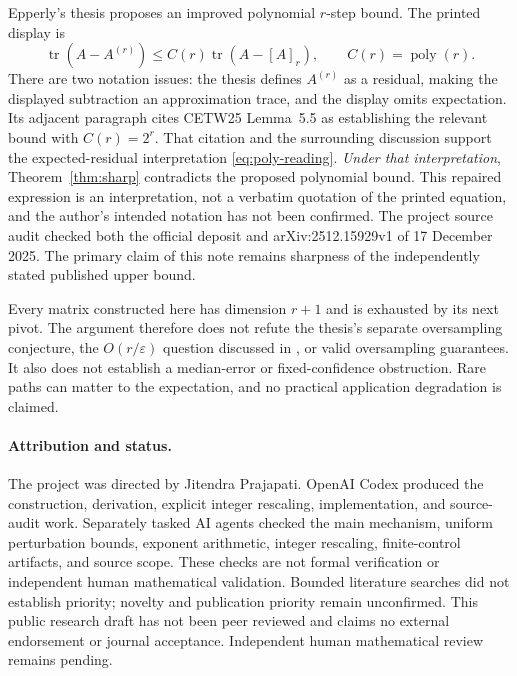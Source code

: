 \documentclass[10pt,letterpaper]{article}
\DeclareMathOperator{\tr}{tr}
\begin{document}
Epperly's thesis \cite[Conjecture~11.2, printed p.~182]{Thesis} proposes
an improved polynomial $r$-step bound. The printed display is
\[
 \tr(A-A^{(r)})\leq C(r)\tr(A-[A]_r),\qquad C(r)=\operatorname{poly}(r).
\]
There are two notation issues: the thesis defines $A^{(r)}$ as a residual,
making the displayed subtraction an approximation trace, and the display
omits expectation. Its adjacent paragraph cites CETW25 Lemma~5.5 as
establishing the relevant bound with $C(r)=2^r$. That citation and the
surrounding discussion support the expected-residual interpretation
\eqref{eq:poly-reading}. \emph{Under that interpretation},
Theorem~\ref{thm:sharp} contradicts the proposed polynomial bound.
This repaired expression is an interpretation, not a verbatim quotation
of the printed equation, and the author's intended notation has not been
confirmed. The project source audit checked both the official deposit
and arXiv:2512.15929v1 of 17 December 2025. The primary claim of this note
remains sharpness of the independently stated published upper bound.

Every matrix constructed here has dimension $r+1$ and is exhausted by its
next pivot. The argument therefore does not refute the thesis's separate
oversampling conjecture, the $O(r/\varepsilon)$ question discussed in
\cite{NewAnalysis}, or valid oversampling guarantees. It also does not
establish a median-error or fixed-confidence obstruction. Rare paths can
matter to the expectation, and no practical application degradation is
claimed.

\paragraph{Attribution and status.}
The project was directed by Jitendra Prajapati. OpenAI Codex produced the
construction, derivation, explicit integer rescaling, implementation,
and source-audit work. Separately tasked AI agents checked the main
mechanism, uniform perturbation bounds, exponent arithmetic, integer
rescaling, finite-control artifacts, and source scope. These checks are
not formal verification or independent human mathematical validation.
Bounded literature searches did not establish priority; novelty and
publication priority remain unconfirmed. This public research draft has
not been peer reviewed and claims no external endorsement or journal
acceptance. Independent human mathematical review remains pending.
\end{document}
